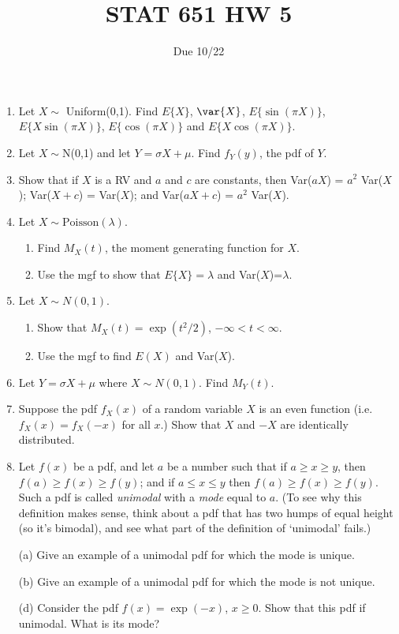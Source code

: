 \documentclass[12pt]{article}
\begin{document}
\title{STAT 651 HW 5}
\author{Due 10/22}
\date{}
\maketitle


\begin{enumerate}
\item Let $X \sim$ Uniform(0,1).
Find $E\{X\}$, $\var\{X\}$,
$E\{\sin(\pi X) \}$, $E\{X \sin(\pi X)\}$,
$E\{\cos(\pi X)\}$ and $E\{X \cos(\pi X)\}$.

\item Let $X \sim $N(0,1) and let $Y = \sigma X + \mu$. Find $f_Y(y)$, the pdf of $Y$.

\item Show that if $X$ is a RV and $a$ and $c$ are constants,
then Var($aX$) = $a^2$ Var($X$); Var($X+c$) = Var($X$); and  Var($aX+c$) = $a^2$ Var($X$).

\item Let $X \sim {\mbox{Poisson}}(\lambda)$.
  \begin{enumerate}
  \item Find $M_X(t)$, the moment generating function for $X$.
  \item Use the mgf to show that $E\{X\}=\lambda$ and Var($X$)=$\lambda$.
  \end{enumerate}

\item Let $X \sim N(0,1)$.
  \begin{enumerate}
  \item Show that $M_X(t) = \exp(t^2/2)$, $-\infty < t < \infty$.
  \item Use the mgf to find $E(X)$ and Var($X$).
  \end{enumerate}

\item Let $Y = \sigma X + \mu$ where $X \sim N(0,1)$. Find $M_Y(t)$.


\item Suppose the pdf $f_X(x)$ of a random variable $X$ is an even
function (i.e.\ $f_X(x) = f_X(-x)$ for all $x$.) Show that $X$ and $-X$ are
identically distributed.

\item
Let $f(x)$ be a pdf, and let $a$ be a number such that 
if $a \ge x \ge y$, then $f(a) \ge f(x) \ge f(y)$;
and if $a \le x \le y$ then $f(a) \ge f(x) \ge f(y)$.
Such a pdf is called {\em{unimodal}} with a {\em{mode}} equal to $a$.
(To see why this definition makes sense, think about a pdf that has
two humps of equal height (so it's bimodal), and see what part of the
definition of `unimodal' fails.)

(a) Give an example of a unimodal pdf for which the mode is unique.

(b) Give an example of a unimodal pdf for which the mode is not unique.

(d) Consider the pdf $f(x) = \exp(-x)$, $x \ge 0$.  Show that this pdf if unimodal.  What
is its mode?
\end{enumerate}
\end{document}
